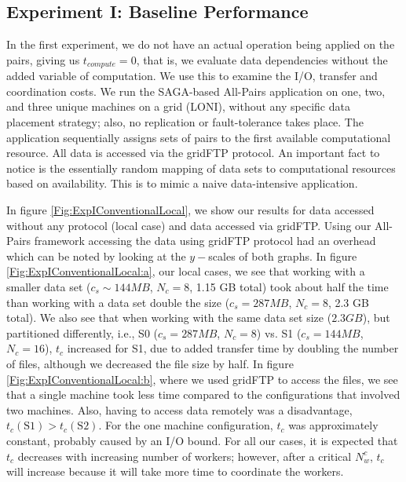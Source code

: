 \documentclass{rspublic}
\begin{document}
\vspace{-0.3cm}

\subsection{Experiment I: Baseline Performance}\label{Sec:gridFTPExp}
In the first experiment, we do not have an actual operation being
applied on the pairs, giving us $t_{compute}=0$, that is, we evaluate
data dependencies without the added variable of computation. We use
this to examine the I/O, transfer and coordination costs. We run the
SAGA-based All-Pairs application on one, two, and three unique machines
on a grid (LONI), without any specific data placement strategy; also,
no replication or fault-tolerance takes place. The application
sequentially assigns sets of pairs to the first available computational
resource. All data is accessed via the gridFTP protocol. An important
fact to notice is the essentially random mapping of data sets to
computational resources based on availability. This is to mimic a naive
data-intensive application. 

In figure \ref{Fig:ExpIConventionalLocal}, we show our results for
data accessed without any protocol (local case) and data accessed via
gridFTP. Using our All-Pairs framework accessing the data using
gridFTP protocol had an overhead which can be noted by looking at the
$y-$scales of both graphs. In figure
\ref{Fig:ExpIConventionalLocal:a}, our local cases, we see that
working with a smaller data set ($c_s \sim 144MB$, $N_c = 8$, 1.15 GB
total) took about half the time than working with a data set double
the size ($c_s = 287MB$, $N_c = 8$, 2.3 GB total). We also see that
when working with the same data set size ($2.3 GB$), but partitioned
differently, i.e., S0 ($c_s = 287MB$, $N_c = 8$) vs. S1 ($c_s =
144MB$, $N_c = 16$), $t_c$ increased for S1, due to added transfer
time by doubling the number of files, although we decreased the file
size by half. In
figure \ref{Fig:ExpIConventionalLocal:b}, where we used gridFTP to
access the files, we see that a single machine took less time compared
to the configurations that involved two machines. Also, having to
access data remotely was a disadvantage, $t_c(\mbox{S1}) >
t_c(\mbox{S2})$. For the one machine configuration, $t_c$ was
approximately constant, probably caused by an I/O bound. For all our
cases, it is expected that $t_c$ decreases with increasing number of
workers; however, after a critical $N^c_w$, $t_c$ will increase
because it will take more time to coordinate the workers.
\end{document}
